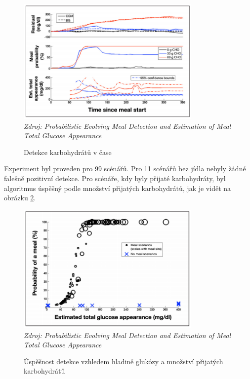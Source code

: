 \begin{figure}[H]
\caption{Detekce karbohydrátů v čase}
\label{fig:diff1}
\centering
\includegraphics[width=0.8\textwidth]{img/analyza/diff1.png}\\
\textit{Zdroj: Probabilistic Evolving Meal Detection and Estimation of Meal Total Glucose Appearance \citep{Analyza.Diff}}
\end{figure}

Experiment byl proveden pro 99 scénářů. Pro 11 scénářů bez jídla nebyly žádné falešně pozitivní detekce. Pro scénáře, kdy byly přijaté karbohydráty, byl algoritmus úspěšný podle množství přijatých karbohydrátů, jak je vidět na obrázku \ref{fig:diff2}.

\begin{figure}[H]
\caption{Úspěšnost detekce vzhledem hladině glukózy a množství přijatých karbohydrátů}
\label{fig:diff2}
\centering
\includegraphics[width=0.8\textwidth]{img/analyza/diff2.png}\\
\textit{Zdroj: Probabilistic Evolving Meal Detection and Estimation of Meal Total Glucose Appearance \citep{Analyza.Diff}}
\end{figure}


